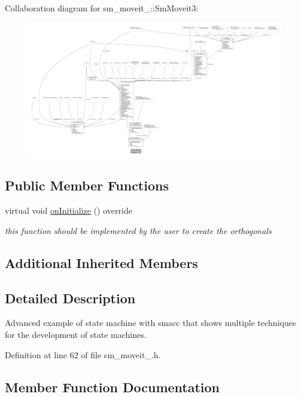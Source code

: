 Collaboration diagram for sm\+\_\+moveit\+\_\+:\+:Sm\+Moveit3\+:
\nopagebreak
\begin{figure}[H]
\begin{center}
\leavevmode
\includegraphics[width=350pt]{structsm__moveit__3_1_1SmMoveit3__coll__graph}
\end{center}
\end{figure}
\subsection*{Public Member Functions}
\begin{DoxyCompactItemize}
\item 
virtual void \hyperlink{structsm__moveit__3_1_1SmMoveit3_afc1eae2ab78a27cd88d642b762501208}{on\+Initialize} () override
\begin{DoxyCompactList}\small\item\em this function should be implemented by the user to create the orthogonals \end{DoxyCompactList}\end{DoxyCompactItemize}
\subsection*{Additional Inherited Members}


\subsection{Detailed Description}
Advanced example of state machine with smacc that shows multiple techniques for the development of state machines. 

Definition at line 62 of file sm\+\_\+moveit\+\_.\+h.



\subsection{Member Function Documentation}
\mbox{\label{structsm__moveit__3_1_1SmMoveit3_afc1eae2ab78a27cd88d642b762501208}} 
